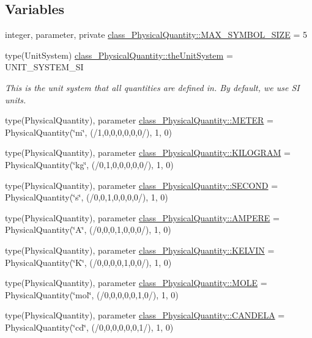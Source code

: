 \subsection*{Variables}
\begin{DoxyCompactItemize}
\item 
integer, parameter, private \hyperlink{namespaceclass__PhysicalQuantity_a2870256032bca15f690a32ce1d1b6c52}{class\_\-PhysicalQuantity::MAX\_\-SYMBOL\_\-SIZE} = 5
\item 
type(UnitSystem) \hyperlink{namespaceclass__PhysicalQuantity_a61173098b2362361938556f5fb35431e}{class\_\-PhysicalQuantity::theUnitSystem} = UNIT\_\-SYSTEM\_\-SI
\begin{DoxyCompactList}\small\item\em This is the unit system that all quantities are defined in. By default, we use SI units. \item\end{DoxyCompactList}\item 
type(PhysicalQuantity), parameter \hyperlink{namespaceclass__PhysicalQuantity_a0633cd9b4645d04d7d47dbd151837757}{class\_\-PhysicalQuantity::METER} = PhysicalQuantity(\char`\"{}m\char`\"{}, (/1,0,0,0,0,0,0/), 1, 0)
\item 
type(PhysicalQuantity), parameter \hyperlink{namespaceclass__PhysicalQuantity_a902db03da895ab4c528d71d99e8549b0}{class\_\-PhysicalQuantity::KILOGRAM} = PhysicalQuantity(\char`\"{}kg\char`\"{}, (/0,1,0,0,0,0,0/), 1, 0)
\item 
type(PhysicalQuantity), parameter \hyperlink{namespaceclass__PhysicalQuantity_a7fdf486aace5a1e99af5a634719bb9ce}{class\_\-PhysicalQuantity::SECOND} = PhysicalQuantity(\char`\"{}s\char`\"{}, (/0,0,1,0,0,0,0/), 1, 0)
\item 
type(PhysicalQuantity), parameter \hyperlink{namespaceclass__PhysicalQuantity_a9672ba1ed56d49205a831ba235421de8}{class\_\-PhysicalQuantity::AMPERE} = PhysicalQuantity(\char`\"{}A\char`\"{}, (/0,0,0,1,0,0,0/), 1, 0)
\item 
type(PhysicalQuantity), parameter \hyperlink{namespaceclass__PhysicalQuantity_a2fd77862111da187e89aaf75383baa00}{class\_\-PhysicalQuantity::KELVIN} = PhysicalQuantity(\char`\"{}K\char`\"{}, (/0,0,0,0,1,0,0/), 1, 0)
\item 
type(PhysicalQuantity), parameter \hyperlink{namespaceclass__PhysicalQuantity_a22a20ab491923015030051550a34c977}{class\_\-PhysicalQuantity::MOLE} = PhysicalQuantity(\char`\"{}mol\char`\"{}, (/0,0,0,0,0,1,0/), 1, 0)
\item 
type(PhysicalQuantity), parameter \hyperlink{namespaceclass__PhysicalQuantity_ad332548c0150950850a5fece3ef0e8d2}{class\_\-PhysicalQuantity::CANDELA} = PhysicalQuantity(\char`\"{}cd\char`\"{}, (/0,0,0,0,0,0,1/), 1, 0)
\end{DoxyCompactItemize}
